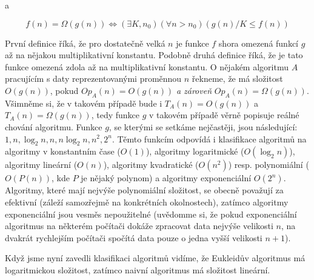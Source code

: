 a

\begin{displaymath}
 f(n) = \Omega(g(n)) \iff (\exists K,n_0)(\forall n>n_0)(g(n)/K\leq f(n))
\end{displaymath}

První definice říká, že pro dostatečně velká $n$ je funkce $f$ shora omezená funkcí $g$ až na nějakou multiplikativní konstantu. Podobně
druhá definice říká, že je tato funkce omezená zdola až na multiplikativní konstantu. O nějakém algoritmu $A$ pracujícím s daty reprezentovanými
proměnnou $n$ řekneme, že má složitost $O(g(n))$, pokud $Op_A(n) = O(g(n))$ \emph{a zároveň} $Op_A(n) = \Omega(g(n))$. Všimněme si, že v takovém
případě bude i $T_A(n) = O(g(n))$ a $T_A(n)=\Omega(g(n))$, tedy funkce $g$ v takovém případě věrně popisuje reálné chování algoritmu. Funkce $g$,
se kterými se setkáme nejčastěji, jsou následující: $1, n, \log_2 n, n, n\log_2 n, n^2, 2^n$. Těmto funkcím odpovídá i klasifikace algoritmů na
algoritmy v konstantním čase ($O(1)$), algoritmy logaritmické ($O(\log_2 n)$), algoritmy lineární ($O(n)$), algoritmy kvadratické ($O(n^2)$) resp.
polynomiální ($O(P(n))$, kde $P$ je nějaký polynom) a algoritmy exponenciální $O(2^n)$. Algoritmy, které mají nejvýše polynomiální složitost, se
obecně považují za efektivní (záleží samozřejmě na konkrétních okolnostech), zatímco algoritmy exponenciální jsou vesměs nepoužitelné (uvědomme si,
že pokud exponenciální algoritmus na některém počítači dokáže zpracovat data nejvýše velikosti $n$, na dvakrát rychlejším počítači spočítá data
pouze o jedna vyšší velikosti $n+1$).

Když jsme nyní zavedli klasifikaci algoritmů vidíme, že Eukleidův algoritmus má logaritmickou složitost, zatímco naivní algoritmus má složitost
lineární.

\ifx\ucebnice\undefined

\fi